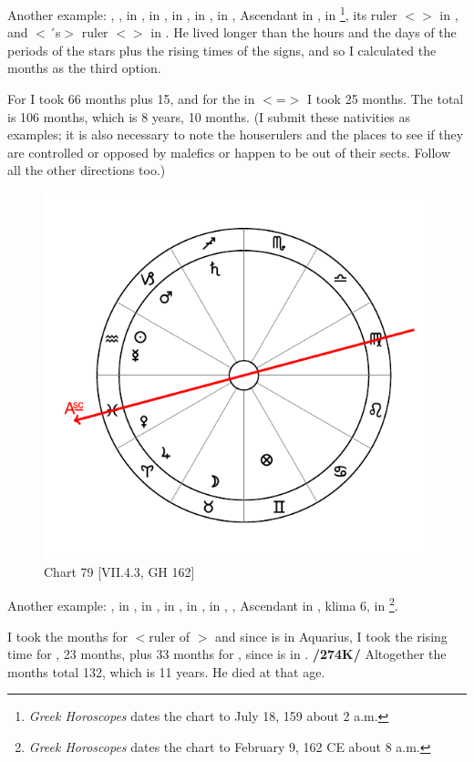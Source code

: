 Another example: \Sun, \Venus, \Mercury\xspace in \Cancer, \Moon\xspace in \Capricorn, \Saturn\xspace in \Scorpio, \Jupiter\xspace in \Aquarius, \Mars\xspace in \Leo, Ascendant in \Taurus, \Fortune\xspace in \Scorpio\footnote{\textit{Greek Horoscopes} dates the chart to July 18, 159 about 2 a.m.}, its ruler $<$\Mars$>$ in \Leo, and $<$\Leo´s$>$ ruler $<$\Sun$>$ in \Cancer. He lived longer than the hours and the days of the periods of the stars plus the rising times of the signs, and so I calculated the months as the third option. 

For \Mars\xspace I took 66 months plus 15, and for the \Sun\xspace in \Cancer $<$=\Moon$>$ I took 25 months. The total is 106 months, which is 8 years, 10 months. (I submit these nativities as examples; it is also necessary to note the houserulers and the places to see
if they are controlled or opposed by malefics or happen to be out of their sects. Follow all the other directions too.)

\newpage
\begin{figure}
\centering
\vspace{-10pt}
\includegraphics[width=.68\textwidth]{charts/7_4_3}
\caption{Chart 79 [VII.4.3, GH 162]}
\label{fig:chart79}
\end{figure} 

Another example: \Sun, \Mercury\xspace in \Aquarius, \Moon\xspace in \Taurus, \Saturn\xspace in \Sagittarius, \Jupiter\xspace in \Aries,
\Mars\xspace in \Capricorn, \Venus, Ascendant in \Pisces, klima 6, \Fortune\xspace in \Gemini\footnote{\textit{Greek Horoscopes} dates the chart to February 9, 162 CE about 8 a.m.}. 

I took the months for \Mercury\xspace $<$ruler of \Gemini$>$ and since \Mercury\xspace is in Aquarius, I took the rising time for \Aquarius, 23 months, plus 33 months for \Sagittarius, since \Saturn\xspace is in \Sagittarius. \textbf{/274K/} Altogether the months total 132, which is 11 years. He died at that age. 


